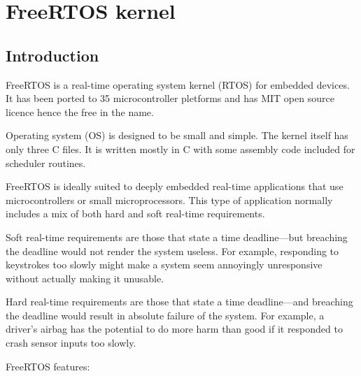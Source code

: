\chapter{FreeRTOS kernel}
\label{freertos_kernel}

\section{Introduction}

FreeRTOS is a real-time operating system kernel (RTOS) for embedded devices. It has been ported to 35 microcontroller pletforms and has MIT open source licence hence the free in the name. \citep{freertos_licence}

Operating system (OS) is designed to be small and simple. The kernel itself has only three C files. It is written mostly in C with some assembly code included for scheduler routines.

FreeRTOS is ideally suited to deeply embedded real-time applications that use
microcontrollers or small microprocessors. This type of application normally includes a mix of
both hard and soft real-time requirements. \citep{freertos_mastering}

Soft real-time requirements are those that state a time deadline—but breaching the deadline
would not render the system useless. For example, responding to keystrokes too slowly might
make a system seem annoyingly unresponsive without actually making it unusable. \citep{freertos_mastering}

Hard real-time requirements are those that state a time deadline—and breaching the deadline
would result in absolute failure of the system. For example, a driver’s airbag has the potential
to do more harm than good if it responded to crash sensor inputs too slowly. \citep{freertos_mastering}

\noindent FreeRTOS features:


